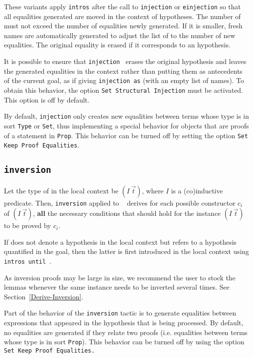 \begin{coq_example*}
\begin{Variants}
These variants apply \texttt{intros} \nelistnosep{\intropattern} after
the call to \texttt{injection} or \texttt{einjection} so that all
equalities generated are moved in the context of hypotheses. The
number of {\intropattern} must not exceed the number of equalities
newly generated. If it is smaller, fresh names are automatically
generated to adjust the list of {\intropattern} to the number of new
equalities. The original equality is erased if it corresponds to an
hypothesis.

\end{Variants}


It is possible to ensure that \texttt{injection {\term}} erases the
original hypothesis and leaves the generated equalities in the context
rather than putting them as antecedents of the current goal, as if
giving \texttt{injection {\term} as} (with an empty list of names). To
obtain this behavior, the option {\tt Set Structural Injection} must
be activated. This option is off by default.

By default, \texttt{injection} only creates new equalities between
terms whose type is in sort \texttt{Type} or \texttt{Set}, thus
implementing a special behavior for objects that are proofs
of a statement in \texttt{Prop}.  This behavior can be turned off
by setting the option \texttt{Set Keep Proof Equalities}.
\subsection{\tt inversion \ident}

Let the type of {\ident} in the local context be $(I~\vec{t})$,
where $I$ is a (co)inductive predicate. Then,
\texttt{inversion} applied to \ident~ derives for each possible
constructor $c_i$ of $(I~\vec{t})$, {\bf all} the necessary
conditions that should hold for the instance $(I~\vec{t})$ to be
proved by $c_i$.

\Rem If {\ident} does not denote a hypothesis in the local context
but refers to a hypothesis quantified in the goal, then the
latter is first introduced in the local context using
\texttt{intros until \ident}.

\Rem As inversion proofs may be large in size, we recommend the user to
stock the lemmas whenever the same instance needs to be inverted
several times. See Section~\ref{Derive-Inversion}.

\Rem Part of the behavior of the \texttt{inversion} tactic is to generate
equalities between expressions that appeared in the hypothesis that is
being processed.  By default, no equalities are generated if they relate
two proofs (i.e. equalities between terms whose type is in
sort \texttt{Prop}).  This behavior can be turned off by using the option
\texttt{Set Keep Proof Equalities.}


\end{coq_example*}
